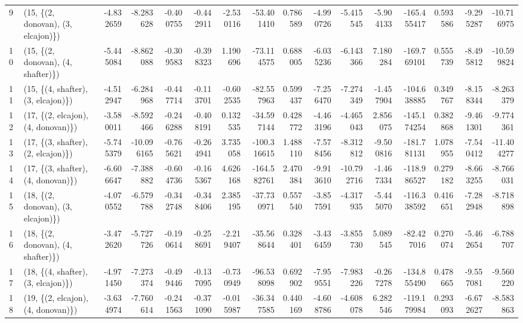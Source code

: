 \begin{tabular}{llrrrrrrrrrrrrrr}
9  &  (15, \{(2, donovan), (3, elcajon)\}) & -4.832659 &  -8.283628 &  -0.400755 & -0.442911 & -2.530116 &  -53.401410 &  0.786589 &  -4.990726 &  -5.415545 & -5.904133 & -165.455417 &  0.593586 &  -9.295287 & -10.716975 \\
10 &  (15, \{(2, donovan), (4, shafter)\}) & -5.445084 &  -8.862088 &  -0.309583 & -0.398323 &  1.190696 &  -73.114575 &  0.688005 &  -6.035236 &  -6.143366 &  7.180284 & -169.769101 &  0.555739 &  -8.495812 & -10.599824 \\
11 &  (15, \{(4, shafter), (3, elcajon)\}) & -4.512947 &  -6.284968 &  -0.447714 & -0.113701 & -0.602535 &  -82.557963 &  0.599437 &  -7.256470 &  -7.274349 & -1.457904 & -104.638885 &  0.349767 &  -8.158344 &  -8.263379 \\
12 &  (17, \{(2, elcajon), (4, donovan)\}) & -3.580011 &  -8.592466 &  -0.246288 & -0.408191 &  0.132535 &  -34.597144 &  0.428772 &  -4.463196 &  -4.465043 &  2.856075 & -145.174254 &  0.382868 &  -9.461301 &  -9.774361 \\
13 &  (17, \{(3, shafter), (2, elcajon)\}) & -5.745379 & -10.096165 &  -0.765621 & -0.264941 &  3.735058 & -100.316615 &  1.488110 &  -7.578456 &  -8.312812 & -9.500816 & -181.781131 &  1.078955 &  -7.540412 & -11.404277 \\
14 &  (17, \{(3, shafter), (4, donovan)\}) & -6.606647 &  -7.388882 &  -0.604736 & -0.165367 &  4.626168 & -164.582761 &  2.470384 &  -9.913610 & -10.792716 & -1.467334 & -118.986527 &  0.279182 &  -8.663255 &  -8.766031 \\
15 &  (18, \{(2, donovan), (3, elcajon)\}) & -4.070552 &  -6.579788 &  -0.342748 & -0.348406 &  2.385195 &  -37.730971 &  0.557540 &  -3.857591 &  -4.317935 & -5.445070 & -116.338592 &  0.416651 &  -7.282948 &  -8.718898 \\
16 &  (18, \{(2, donovan), (4, shafter)\}) & -3.472620 &  -5.727726 &  -0.190614 & -0.258691 & -2.219407 &  -35.568644 &  0.328401 &  -3.436459 &  -3.855730 &  5.089545 &  -82.427016 &  0.270074 &  -5.462654 &  -6.788707 \\
17 &  (18, \{(4, shafter), (3, elcajon)\}) & -4.971450 &  -7.273374 &  -0.499446 & -0.137095 & -0.730949 &  -96.538098 &  0.692902 &  -7.959551 &  -7.983226 & -0.267278 & -134.855490 &  0.478665 &  -9.557081 &  -9.560220 \\
18 &  (19, \{(2, elcajon), (4, donovan)\}) & -3.634974 &  -7.760614 &  -0.241563 & -0.371090 & -0.015987 &  -36.347585 &  0.440169 &  -4.608786 &  -4.608078 &  6.282546 & -119.179984 &  0.293093 &  -6.672627 &  -8.583863 \\

\end{tabular}
